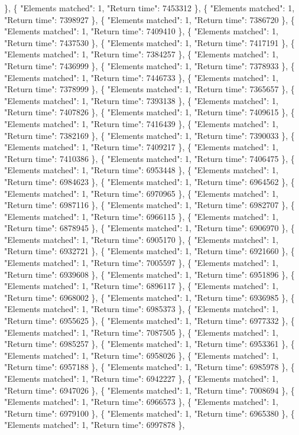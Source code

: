 \}, \{ "Elements matched": 1, "Return time": 7453312 \}, \{ "Elements matched": 1, "Return time": 7398927 \}, \{ "Elements matched": 1, "Return time": 7386720 \}, \{ "Elements matched": 1, "Return time": 7409410 \}, \{ "Elements matched": 1, "Return time": 7437530 \}, \{ "Elements matched": 1, "Return time": 7417191 \}, \{ "Elements matched": 1, "Return time": 7384257 \}, \{ "Elements matched": 1, "Return time": 7436999 \}, \{ "Elements matched": 1, "Return time": 7378933 \}, \{ "Elements matched": 1, "Return time": 7446733 \}, \{ "Elements matched": 1, "Return time": 7378999 \}, \{ "Elements matched": 1, "Return time": 7365657 \}, \{ "Elements matched": 1, "Return time": 7393138 \}, \{ "Elements matched": 1, "Return time": 7407826 \}, \{ "Elements matched": 1, "Return time": 7409615 \}, \{ "Elements matched": 1, "Return time": 7416439 \}, \{ "Elements matched": 1, "Return time": 7382169 \}, \{ "Elements matched": 1, "Return time": 7390033 \}, \{ "Elements matched": 1, "Return time": 7409217 \}, \{ "Elements matched": 1, "Return time": 7410386 \}, \{ "Elements matched": 1, "Return time": 7406475 \}, \{ "Elements matched": 1, "Return time": 6953448 \}, \{ "Elements matched": 1, "Return time": 6984623 \}, \{ "Elements matched": 1, "Return time": 6964562 \}, \{ "Elements matched": 1, "Return time": 6970965 \}, \{ "Elements matched": 1, "Return time": 6987116 \}, \{ "Elements matched": 1, "Return time": 6982707 \}, \{ "Elements matched": 1, "Return time": 6966115 \}, \{ "Elements matched": 1, "Return time": 6878945 \}, \{ "Elements matched": 1, "Return time": 6906970 \}, \{ "Elements matched": 1, "Return time": 6905170 \}, \{ "Elements matched": 1, "Return time": 6932721 \}, \{ "Elements matched": 1, "Return time": 6921660 \}, \{ "Elements matched": 1, "Return time": 7005597 \}, \{ "Elements matched": 1, "Return time": 6939608 \}, \{ "Elements matched": 1, "Return time": 6951896 \}, \{ "Elements matched": 1, "Return time": 6896117 \}, \{ "Elements matched": 1, "Return time": 6968002 \}, \{ "Elements matched": 1, "Return time": 6936985 \}, \{ "Elements matched": 1, "Return time": 6985373 \}, \{ "Elements matched": 1, "Return time": 6955625 \}, \{ "Elements matched": 1, "Return time": 6977332 \}, \{ "Elements matched": 1, "Return time": 7087505 \}, \{ "Elements matched": 1, "Return time": 6985257 \}, \{ "Elements matched": 1, "Return time": 6953361 \}, \{ "Elements matched": 1, "Return time": 6958026 \}, \{ "Elements matched": 1, "Return time": 6957188 \}, \{ "Elements matched": 1, "Return time": 6985978 \}, \{ "Elements matched": 1, "Return time": 6942227 \}, \{ "Elements matched": 1, "Return time": 6947026 \}, \{ "Elements matched": 1, "Return time": 7008694 \}, \{ "Elements matched": 1, "Return time": 6966573 \}, \{ "Elements matched": 1, "Return time": 6979100 \}, \{ "Elements matched": 1, "Return time": 6965380 \}, \{ "Elements matched": 1, "Return time": 6997878 \},

